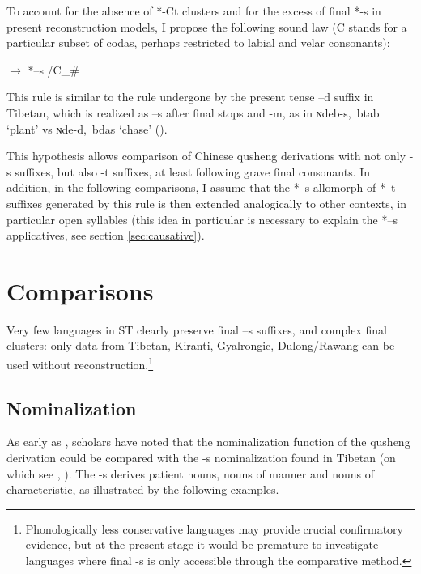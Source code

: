 \documentclass[oldfontcommands,oneside,a4paper,11pt]{article}
\newcommand{\ipa}[1]{{\phon \mbox{#1}}} %
\begin{document}
To account for the absence of *-Ct clusters and for the excess of final *-s in present reconstruction models, I propose the following sound law (C stands for a particular subset of codas, perhaps restricted to labial and velar consonants):

\begin{exe}
\ex \label{ex:ts}
\glt *\ipa{--t} $\rightarrow$ *\ipa{--s} /C\_\# 
\end{exe}

This rule is similar to the rule undergone by the present tense \ipa{--d} suffix in Tibetan, which is realized as \ipa{--s} after final stops and \ipa{-m}, as in \ipa{ɴdeb-s, btab}   `plant' vs \ipa{ɴde-d, bdas}   `chase' (\citealt[52-53]{coblin76}). 

This hypothesis allows comparison of Chinese qusheng derivations with not only \ipa{-s} suffixes, but also \ipa{-t} suffixes, at least following grave final consonants. In addition, in the following comparisons, I assume that the *\ipa{--s} allomorph of *\ipa{--t} suffixes generated by this rule is then extended analogically to other contexts, in particular open syllables (this idea in particular is necessary to explain the *\ipa{--s} applicatives, see section \ref{sec:causative}).


\section{Comparisons}

Very few languages in ST clearly preserve final \ipa{--s} suffixes, and complex final clusters: only data from Tibetan, Kiranti, Gyalrongic, Dulong/Rawang can be used without reconstruction.\footnote{Phonologically less conservative languages may provide crucial confirmatory evidence, but at the present stage it would be premature to investigate languages where final \ipa{-s} is only accessible through the comparative method. }

\subsection{Nominalization}
As early as \citet{forrest60occlusives}, scholars have noted that the nominalization function of the qusheng derivation could be compared with the \ipa{-s} nominalization found in Tibetan (on which see \citealt[43]{conrady1896}, \citealt[624-5]{hill14derivational}). The \ipa{-s} derives patient nouns, nouns of manner and nouns of characteristic, as illustrated by the following examples.
\end{document}
